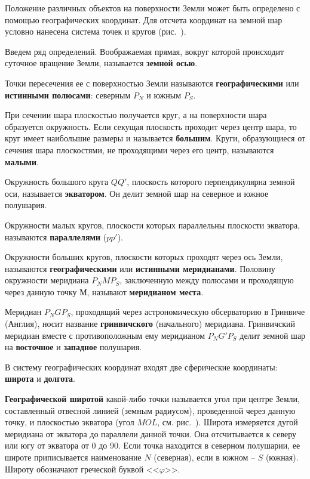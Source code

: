 Положение различных объектов на поверхности Земли может быть определено с помощью географических координат. Для отсчета координат на земной шар условно нанесена система точек и кругов (рис.~). 

Введем ряд определений. Воображаемая прямая, вокруг которой происходит суточное вращение Земли, называется \textbf{земной осью}.

Точки пересечения ее с поверхностью Земли называются \textbf{географическими} или \textbf{истинными полюсами}: северным $P_N$ и южным $P_S$.

При сечении шара плоскостью получается круг, а на поверхности шара образуется окружность. Если секущая плоскость проходит через центр шара, то круг имеет наибольшие размеры и называется \textbf{большим}. Круги, образующиеся от сечения шара плоскостями, не проходящими через его центр, называются \textbf{малыми}. 

Окружность большого круга $QQ'$, плоскость которого перпендикулярна земной оси, называется \textbf{экватором}. Он делит земной шар на северное и южное полушария. 

Окружности малых кругов, плоскости которых параллельны плоскости экватора, называются \textbf{параллелями} ($pp'$). 

Окружности больших кругов, плоскости которых проходят через ось Земли, называются \textbf{географическими} или \textbf{истинными меридианами}. Половину окружности меридиана $P_NMP_S$, заключенную между полюсами и проходящую через данную точку $М$, называют \textbf{меридианом места}.

 Меридиан $P_NGP_S$, проходящий через астрономическую обсерваторию в Гринвиче (Англия), носит название \textbf{гринвичского} (начального) меридиана. Гринвичский меридиан вместе с противоположным ему меридианом $P_NG'P_S$ делит земной шар на \textbf{восточное} и \textbf{западное} полушария. 

В систему географических координат входят две сферические координаты: \textbf{широта} и \textbf{долгота}.

\textbf{Географической широтой} какой-либо точки называется угол при центре Земли, составленный отвесной линией (земным радиусом), проведенной через данную точку, и плоскостью экватора (угол $MOL$, см. рис.~). Широта измеряется дугой меридиана от экватора до параллели данной точки. Она отсчитывается к северу или югу от экватора от 0 до 90\gr. Если точка находится в северном полушарии, ее широте приписывается наименование $N$ (северная), если в южном \--- $S$ (южная). Широту обозначают греческой буквой <<$\varphi$>>. 

